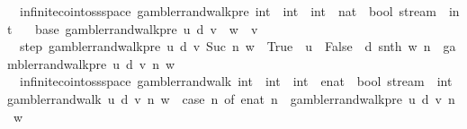 \begin{isabellebody}
{}
\isamarkuptrue%
%
\endisatagdocument
{\isafolddocument}%
%
\isadelimdocument
%
\endisadelimdocument
{}\isamarkupfalse%
\ {\isacharparenleft}{\kern0pt}\ infinite{\isacharunderscore}{\kern0pt}coin{\isacharunderscore}{\kern0pt}toss{\isacharunderscore}{\kern0pt}space{\isacharparenright}{\kern0pt}\ gambler{\isacharunderscore}{\kern0pt}rand{\isacharunderscore}{\kern0pt}walk{\isacharunderscore}{\kern0pt}pre{\isacharcolon}{\kern0pt}{\isacharcolon}{\kern0pt}\ {\isachardoublequoteopen}int\ {\isasymRightarrow}\ int\ {\isasymRightarrow}\ int\ {\isasymRightarrow}\ {\isacharparenleft}{\kern0pt}nat\ {\isasymRightarrow}\ bool\ stream\ {\isasymRightarrow}\ int{\isacharparenright}{\kern0pt}{\isachardoublequoteclose}\ \isanewline
\ \ base{\isacharcolon}{\kern0pt}\ {\isachardoublequoteopen}gambler{\isacharunderscore}{\kern0pt}rand{\isacharunderscore}{\kern0pt}walk{\isacharunderscore}{\kern0pt}pre\ u\ d\ v\ {}\ w\ {\isacharequal}{\kern0pt}\ v{\isachardoublequoteclose}{\isacharbar}{\kern0pt}\isanewline
\ \ step{}{\isacharcolon}{\kern0pt}\ {\isachardoublequoteopen}gambler{\isacharunderscore}{\kern0pt}rand{\isacharunderscore}{\kern0pt}walk{\isacharunderscore}{\kern0pt}pre\ u\ d\ v\ {\isacharparenleft}{\kern0pt}Suc\ n{\isacharparenright}{\kern0pt}\ w\ {\isacharequal}{\kern0pt}\ {\isacharparenleft}{\kern0pt}{\isacharparenleft}{\kern0pt}{\isasymlambda}True\ {\isasymRightarrow}\ u\ {\isacharbar}{\kern0pt}\ False\ {\isasymRightarrow}\ d{\isacharparenright}{\kern0pt}\ {\isacharparenleft}{\kern0pt}snth\ w\ n{\isacharparenright}{\kern0pt}{\isacharparenright}{\kern0pt}\ {\isacharplus}{\kern0pt}\ gambler{\isacharunderscore}{\kern0pt}rand{\isacharunderscore}{\kern0pt}walk{\isacharunderscore}{\kern0pt}pre\ u\ d\ v\ n\ w{\isachardoublequoteclose}\isanewline
\isanewline
{}\isamarkupfalse%
\ {\isacharparenleft}{\kern0pt}\ infinite{\isacharunderscore}{\kern0pt}coin{\isacharunderscore}{\kern0pt}toss{\isacharunderscore}{\kern0pt}space{\isacharparenright}{\kern0pt}\ gambler{\isacharunderscore}{\kern0pt}rand{\isacharunderscore}{\kern0pt}walk{\isacharcolon}{\kern0pt}{\isacharcolon}{\kern0pt}\ {\isachardoublequoteopen}int\ {\isasymRightarrow}\ int\ {\isasymRightarrow}\ int\ {\isasymRightarrow}\ {\isacharparenleft}{\kern0pt}enat\ {\isasymRightarrow}\ bool\ stream\ {\isasymRightarrow}\ int{\isacharparenright}{\kern0pt}{\isachardoublequoteclose}\ \isanewline
{\isachardoublequoteopen}gambler{\isacharunderscore}{\kern0pt}rand{\isacharunderscore}{\kern0pt}walk\ u\ d\ v\ n\ w\ {\isacharequal}{\kern0pt}\ {\isacharparenleft}{\kern0pt}case\ n\ of\ enat\ n\ {\isasymRightarrow}\ {\isacharparenleft}{\kern0pt}gambler{\isacharunderscore}{\kern0pt}rand{\isacharunderscore}{\kern0pt}walk{\isacharunderscore}{\kern0pt}pre\ u\ d\ v\ n\ w{\isacharparenright}{\kern0pt}{\isacharbar}{\kern0pt}{\isasyminfinity}\ {\isasymRightarrow}\ {\isacharminus}{\kern0pt}{}{\isacharparenright}{\kern0pt}{\isachardoublequoteclose}%

\end{isabellebody}
